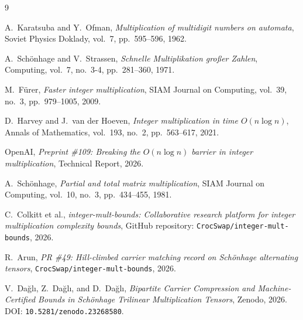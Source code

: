 \documentclass[11pt,a4paper]{article}
\begin{document}
\begin{thebibliography}{9}

A.~Karatsuba and Y.~Ofman,
\textit{Multiplication of multidigit numbers on automata},
Soviet Physics Doklady, vol.~7, pp.~595--596, 1962.

A.~Sch\"{o}nhage and V.~Strassen,
\textit{Schnelle Multiplikation gro\ss{}er Zahlen},
Computing, vol.~7, no.~3-4, pp.~281--360, 1971.

M.~F\"{u}rer,
\textit{Faster integer multiplication},
SIAM Journal on Computing, vol.~39, no.~3, pp.~979--1005, 2009.

D.~Harvey and J.~van der Hoeven,
\textit{Integer multiplication in time $O(n \log n)$},
Annals of Mathematics, vol.~193, no.~2, pp.~563--617, 2021.

OpenAI,
\textit{Preprint \#109: Breaking the $O(n \log n)$ barrier in integer multiplication},
Technical Report, 2026.

A.~Sch\"{o}nhage,
\textit{Partial and total matrix multiplication},
SIAM Journal on Computing, vol.~10, no.~3, pp.~434--455, 1981.

C.~Colkitt et al.,
\textit{integer-mult-bounds: Collaborative research platform for integer multiplication complexity bounds},
GitHub repository: \texttt{CrocSwap/integer-mult-bounds}, 2026.

R.~Arun,
\textit{PR \#49: Hill-climbed carrier matching record on Sch\"{o}nhage alternating tensors},
\texttt{CrocSwap/integer-mult-bounds}, 2026.

V.~Da\u{g}l\i, Z.~Da\u{g}l\i, and D.~Da\u{g}l\i,
\textit{Bipartite Carrier Compression and Machine-Certified Bounds in Sch\"{o}nhage Trilinear Multiplication Tensors},
Zenodo, 2026. DOI: \texttt{10.5281/zenodo.23268580}.

\end{thebibliography}
\end{document}
